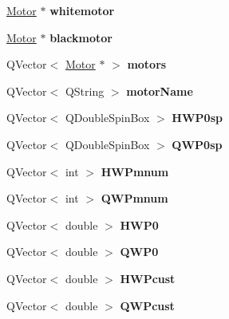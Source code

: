 \begin{DoxyCompactItemize}
\mbox{\label{classcagecontrol_ac345b05074401d11ce84f6e56a24538b}} 
\hyperlink{classMotor}{Motor} $\ast$ {\bfseries whitemotor}
\item 
\mbox{\label{classcagecontrol_a4e5d64b7fc46495e7f1c8824ccb2b8d8}} 
\hyperlink{classMotor}{Motor} $\ast$ {\bfseries blackmotor}
\item 
\mbox{\label{classcagecontrol_a8c4968b6ced27c21dafbc9c804e96ba0}} 
Q\+Vector$<$ \hyperlink{classMotor}{Motor} $\ast$ $>$ {\bfseries motors}
\item 
\mbox{\label{classcagecontrol_a8e87cb65e7cd3b01bb35709ee62e5226}} 
Q\+Vector$<$ Q\+String $>$ {\bfseries motor\+Name}
\item 
\mbox{\label{classcagecontrol_a5af27745d1d9e0b9411d8445f5648e74}} 
Q\+Vector$<$ Q\+Double\+Spin\+Box $>$ {\bfseries H\+W\+P0sp}
\item 
\mbox{\label{classcagecontrol_a026cbda0584d3b18cab5c30fec167ce2}} 
Q\+Vector$<$ Q\+Double\+Spin\+Box $>$ {\bfseries Q\+W\+P0sp}
\item 
\mbox{\label{classcagecontrol_a2ed383394220bea867589a6e7939156f}} 
Q\+Vector$<$ int $>$ {\bfseries H\+W\+Pmnum}
\item 
\mbox{\label{classcagecontrol_a0ecfc817dfe853a073e6b11b3ac9c53c}} 
Q\+Vector$<$ int $>$ {\bfseries Q\+W\+Pmnum}
\item 
\mbox{\label{classcagecontrol_a89582491b0b4f2421abe2e7cad735505}} 
Q\+Vector$<$ double $>$ {\bfseries H\+W\+P0}
\item 
\mbox{\label{classcagecontrol_a6f1fca7829c5e2c25e6a15969aa9a622}} 
Q\+Vector$<$ double $>$ {\bfseries Q\+W\+P0}
\item 
\mbox{\label{classcagecontrol_a1502c9ebc5e04d61af76492d563f9e0e}} 
Q\+Vector$<$ double $>$ {\bfseries H\+W\+Pcust}
\item 
\mbox{\label{classcagecontrol_a43e35156274c70bda842d25680a9159d}} 
Q\+Vector$<$ double $>$ {\bfseries Q\+W\+Pcust}
\end{DoxyCompactItemize}


